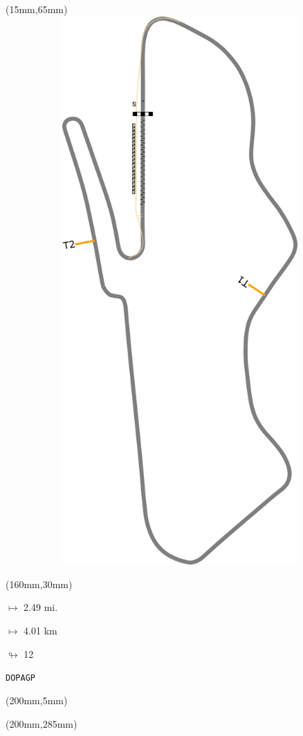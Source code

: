 \begin{textblock*}{185mm}(15mm,65mm)%
\centering
\mbox{\includegraphics[width=185mm,height=210mm,keepaspectratio]{PT/DOPAGP.pdf}}
\end{textblock*}
\begin{textblock*}{40mm}(160mm,30mm)%
\Large
\par$\mapsto$ 2.49 mi.
\par$\mapsto$ 4.01 km
\par$\looparrowright$ 12
\par\hfill\tiny\tt DOPAGP\\
\end{textblock*}
\begin{textblock*}{20mm}(200mm,5mm)%
\fbox{\thepage}
\label{DOPAGP}
\end{textblock*}
\begin{textblock*}{20mm}(200mm,285mm)%
\fbox{\thepage}
\end{textblock*}

